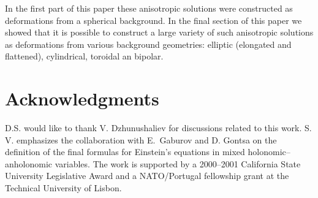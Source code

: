 \documentclass[a4paper,preprint,prabib,aps]{revtex4}
\begin{document}
In the first part of this paper these anisotropic solutions were constructed
as deformations from a spherical background. In the final section of this
paper we showed that it is possible to construct a large variety of such
anisotropic solutions as deformations from various background geometries:
elliptic (elongated and flattened), cylindrical, toroidal an bipolar.

\section*{Acknowledgments}

D.S. would like to thank V. Dzhunushaliev for discussions related to this
work. S. V. emphasizes the collaboration with E.\ Gaburov and D. Gontsa on
the definition of the final formulas for Einstein's equations in mixed
holonomic--anholonomic variables. The work is supported by a 2000--2001
California State University Legislative Award and
a NATO/Portugal fellowship grant at the Technical University of Lisbon.
\end{document}
